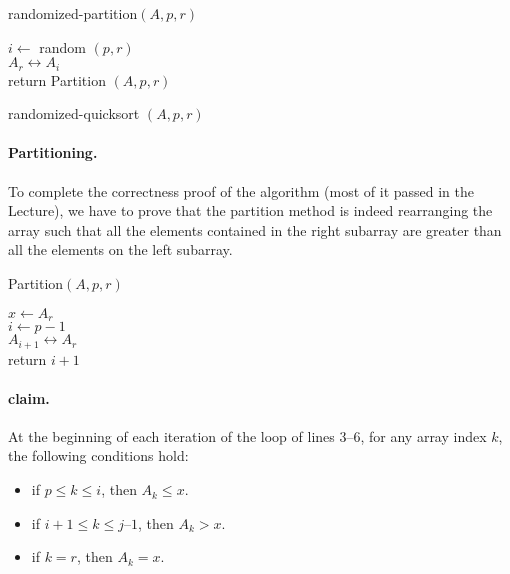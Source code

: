 \begin{algbox}{randomized-partition$(A, p, r)$}
  \begin{algorithm}[H]
      $i \leftarrow $ random $(p, r)$ \\
      $A_{r} \leftrightarrow A_{i} $ \\
      return Partition $(A, p, r)$
    \end{algorithm}
\end{algbox}
 \begin{algbox}{randomized-quicksort $(A, p, r)$}
      \begin{algorithm}[H]
      \end{algorithm}
\end{algbox}


\paragraph{Partitioning.}
To complete the correctness proof of the algorithm (most of it passed in the Lecture), we have to prove that the partition method is indeed rearranging the array such that all the elements contained in the right subarray are greater than all the elements on the left subarray.  


\begin{algbox}{Partition$(A, p, r)$}
  \begin{algorithm}[H]
    $ x \leftarrow A_{r} $ \\
    $ i \leftarrow p - 1 $ \\
   $ A_{i+1} \leftrightarrow A_{r} $\\
   return $ i+1$
  \end{algorithm}
\end{algbox}

\paragraph{claim.} At the beginning of each iteration of the loop of lines 3–6, for any array index $k$, the following conditions hold:
\begin{itemize}
  \item  if $p \le k \le i$, then $A_{k} \le x$.
  \item  if $i + 1 \le k \le j – 1$, then $A_{k} > x$.
  \item  if $k = r$, then $A_{k} = x$.
\end{itemize}
